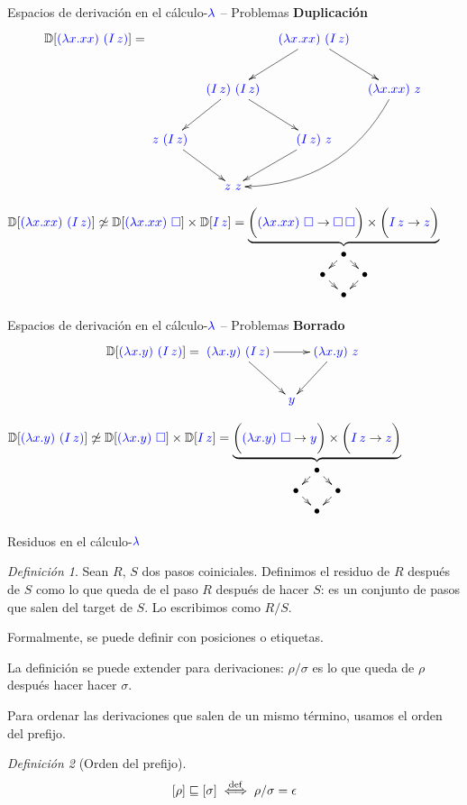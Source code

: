 \documentclass{beamer}
\theoremstyle{remark}
\newtheorem{defes}{Definición}
\newcommand{\cLam}[1]{{\color{darkBlue} #1}}
\newcommand{\clambda}{\cLam{\lambda}}
\begin{document}
\begin{frame}{Espacios de derivación en el cálculo-$\clambda$ -- Problemas}
\textbf{Duplicación}
\[\ulbDeriv{\cLam{(\lam{x}{x x})\ (I\, z)}} =
\xymatrix@C=0.3cm{
& & \cLam{(\lam{x}{x x})\ (I\, z)} \ar[dr] \ar[dl] & \\
& \cLam{(I\, z)\ (I\, z)} \ar[dr] \ar[dl] & & \cLam{(\lam{x}{x x})\ z} \ar@/^2.0pc/[ddll]\\
\cLam{z\ (I\, z)} \ar[dr] & & \cLam{(I\, z)\ z} \ar[dl] & \\
 & \cLam{z\ z} & & \\
}
\]

{\footnotesize
$\ulbDeriv{\cLam{(\lam{x}{x x})\ (I\, z)}}
\not\simeq
\ulbDeriv{\cLam{(\lam{x}{x x})\ \conbase}} \times \ulbDeriv{\cLam{I\, z}}
=
\underbrace{\bigg(\cLam{(\lam{x}{x x})\ \conbase} \to \cLam{\conbase \, \conbase}\bigg) \times \bigg(\cLam{I\, z} \to \cLam{z}\bigg)}_{\xymatrix@=0.2cm{
& \bullet \ar[dr] \ar[dl] & \\
\bullet \ar[dr] & & \bullet \ar[dl] \\
& \bullet &}}$
}
\end{frame}

\begin{frame}{Espacios de derivación en el cálculo-$\clambda$ -- Problemas}
\textbf{Borrado}
\[\ulbDeriv{\cLam{(\lam{x}{y})\ (I\, z)}} =
\xymatrix@C=0.3cm{
\cLam{(\lam{x}{y})\ (I\, z)} \ar[rr] \ar[dr] & & \cLam{(\lam{x}{y})\ z} \ar[dl]\\
& \cLam{y} & \\
}
\]

{\footnotesize
$\ulbDeriv{\cLam{(\lam{x}{y})\ (I\, z)}}
\not\simeq
\ulbDeriv{\cLam{(\lam{x}{y})\ \conbase}} \times \ulbDeriv{\cLam{I\, z}}
=
\underbrace{\bigg(\cLam{(\lam{x}{y})\ \conbase} \to \cLam{y}\bigg) \times \bigg(\cLam{I\, z} \to \cLam{z}\bigg)}_{\xymatrix@=0.2cm{
& \bullet \ar[dr] \ar[dl] & \\
\bullet \ar[dr] & & \bullet \ar[dl] \\
& \bullet &}}$
}
\end{frame}

\begin{frame}{Residuos en el cálculo-$\clambda$}
\begin{defes}
Sean $R$, $S$ dos pasos coiniciales. Definimos el residuo de $R$ después de $S$ como lo que queda
de el paso $R$ después de hacer $S$: es un conjunto de pasos que salen del target de $S$.
Lo escribimos como $R/S$.

Formalmente, se puede definir con posiciones o etiquetas.
\end{defes}
\vskip 0.2cm
La definición se puede extender para derivaciones: $\rho/\sigma$ es lo que
queda de $\rho$ después hacer hacer $\sigma$.

\vskip 0.7cm

Para ordenar las derivaciones que salen de un mismo término, usamos el orden del prefijo.

\begin{defes}[Orden del prefijo]
\[[\rho] \sqsubseteq [\sigma]   \overset{\mathrm{def}}{\iff} \rho / \sigma = \epsilon\]
\end{defes}
\end{frame}
\end{document}
